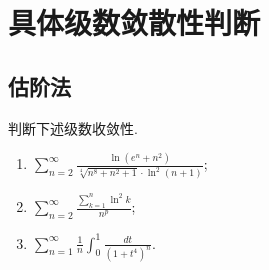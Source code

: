 \documentclass[../../main.tex]{subfiles}
\begin{document}
\section{具体级数敛散性判断}

\subsection{估阶法}

\begin{example}
判断下述级数收敛性.
\begin{enumerate}
\item \( \sum_{n = 2}^{\infty} \frac{\ln \left( e^n + n^2 \right)}{\sqrt[4]{n^8 + n^2 + 1} \cdot \ln^2 (n + 1)} \);

\item \( \sum_{n = 2}^{\infty} \frac{\sum\limits_{k = 1}^{n} \ln^2 k}{n^p} \);

\item \( \sum_{n = 1}^{\infty} \frac{1}{n} \int_{0}^{1} \frac{dt}{\left( 1 + t^4 \right)^n} \).
\end{enumerate}
\end{example}
\end{document}
